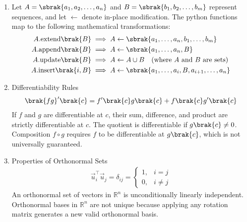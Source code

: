 \begin{enumerate}[label=\thesubsection.\arabic*, ref=\thesubsection.\theenumi]
\item 
Let $A = \sbrak{a_1, a_2, \dots, a_n}$ and $B = \sbrak{b_1, b_2, \dots, b_m}$ represent sequences, and let $\gets$ denote in-place modification. The python functions map to the following mathematical transformations:
\begin{align}
	A.\text{extend}\brak{B} &\implies A \gets \sbrak{a_1, \dots, a_n, b_1, \dots, b_m} \label{eq:DA2025-python_extend}
	\\
	A.\text{append}\brak{B} &\implies A \gets \sbrak{a_1, \dots, a_n, B} \label{eq:DA2025-python_append}
	\\
	A.\text{update}\brak{B} &\implies A \gets A \cup B \quad \text{(where $A$ and $B$ are sets)} \label{eq:DA2025-python_update}
	\\
	A.\text{insert}\brak{i, B} &\implies A \gets \sbrak{a_1, \dots, a_i, B, a_{i+1}, \dots, a_n} \label{eq:DA2025-python_insert}
\end{align}
	\item Differentiability Rules
	\begin{align}
		\brak{fg}'\brak{c} = f'\brak{c}g\brak{c} + f\brak{c}g'\brak{c} \label{eq:DA2025-product_rule}
	\end{align}
	If $f$ and $g$ are differentiable at $c$, their sum, difference, and product are strictly differentiable at $c$. The quotient is differentiable if $g\brak{c} \ne 0$. Composition $f \circ g$ requires $f$ to be differentiable at $g\brak{c}$, which is not universally guaranteed.
\item Properties of Orthonormal Sets
\begin{align}
	\vec{u}_i^\top \vec{u}_j = \delta_{ij} = \begin{cases} 
		1, & i = j \\ 
		0, & i \neq j 
	\end{cases} \label{eq:DA2025-orthonormal}
\end{align}
An orthonormal set of vectors in $\mathbb{R}^n$ is unconditionally linearly independent. Orthonormal bases in $\mathbb{R}^n$ are not unique because applying any rotation matrix generates a new valid orthonormal basis.
	

\end{enumerate}
